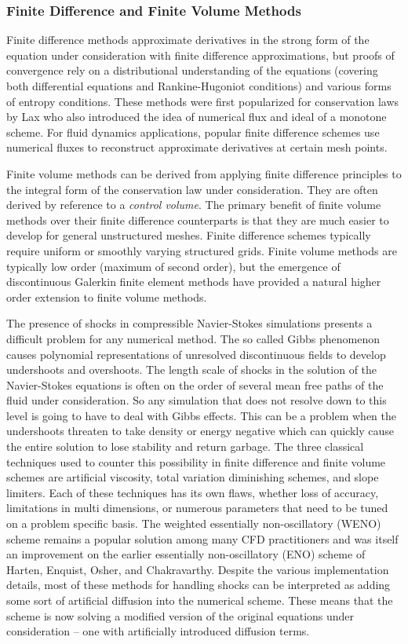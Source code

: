 \documentclass[Dissertation.tex]{subfiles}
\begin{document}
\subsubsection{Finite Difference and Finite Volume Methods}
Finite difference methods approximate derivatives in the strong form of the equation under consideration with finite difference approximations,
but proofs of convergence rely on a distributional understanding of the equations (covering both differential equations and Rankine-Hugoniot conditions)
and various forms of entropy conditions.
These methods were first popularized for conservation laws by Lax who also introduced the idea of numerical flux and ideal of a monotone scheme.
For fluid dynamics applications, popular finite difference schemes use numerical fluxes to reconstruct approximate derivatives at certain mesh points.

Finite volume methods can be derived from applying finite difference principles to the integral form of the conservation law under consideration.
They are often derived by reference to a \emph{control volume}.
The primary benefit of finite volume methods over their finite difference counterparts is that they are much easier to develop for general unstructured meshes.
Finite difference schemes typically require uniform or smoothly varying structured grids.
Finite volume methods are typically low order (maximum of second order), but the emergence of discontinuous Galerkin finite element methods
have provided a natural higher order extension to finite volume methods.

The presence of shocks in compressible Navier-Stokes simulations presents a difficult problem for any numerical method.
The so called Gibbs phenomenon causes polynomial representations of unresolved discontinuous fields to develop undershoots and overshoots.
The length scale of shocks in the solution of the Navier-Stokes equations is often on the order of several mean free paths of the fluid under consideration.
So any simulation that does not resolve down to this level is going to have to deal with Gibbs effects.
This can be a problem when the undershoots threaten to take density or energy negative which can quickly cause the entire solution to
lose stability and return garbage.
The three classical techniques used to counter this possibility in finite difference and finite volume schemes are artificial viscosity,
total variation diminishing schemes, and slope limiters.
Each of these techniques has its own flaws, whether loss of accuracy, limitations in multi dimensions, or numerous parameters that need
to be tuned on a problem specific basis.
The weighted essentially non-oscillatory (WENO) scheme\cite{WENO} remains a popular solution among many CFD practitioners and was itself an improvement
on the earlier essentially non-oscillatory (ENO) scheme of Harten, Enquist, Osher, and Chakravarthy\cite{ENO}.
Despite the various implementation details, most of these methods for handling shocks can be interpreted as adding some sort of artificial diffusion
into the numerical scheme.
These means that the scheme is now solving a modified version of the original equations under consideration
-- one with artificially introduced diffusion terms.
\end{document}
